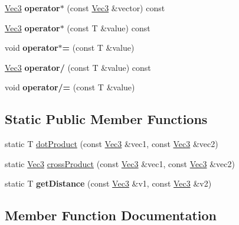 \begin{DoxyCompactItemize}
\item 
\hypertarget{classVec3_a2b0bcbfa60b9246c4d4caf4a16800a45}{}\hyperlink{classVec3}{Vec3} {\bfseries operator$\ast$} (const \hyperlink{classVec3}{Vec3} \&vector) const \label{classVec3_a2b0bcbfa60b9246c4d4caf4a16800a45}

\item 
\hypertarget{classVec3_a6e2368bfdc48fc5f511a46f506244528}{}\hyperlink{classVec3}{Vec3} {\bfseries operator$\ast$} (const T \&value) const \label{classVec3_a6e2368bfdc48fc5f511a46f506244528}

\item 
\hypertarget{classVec3_a2c0d79315c313547c607f8b59a498b50}{}void {\bfseries operator$\ast$=} (const T \&value)\label{classVec3_a2c0d79315c313547c607f8b59a498b50}

\item 
\hypertarget{classVec3_aaae44d307a6d0c142360ba4f50447d60}{}\hyperlink{classVec3}{Vec3} {\bfseries operator/} (const T \&value) const \label{classVec3_aaae44d307a6d0c142360ba4f50447d60}

\item 
\hypertarget{classVec3_a5a71e64e02e97ee191354b153800f3ff}{}void {\bfseries operator/=} (const T \&value)\label{classVec3_a5a71e64e02e97ee191354b153800f3ff}

\end{DoxyCompactItemize}
\subsection*{Static Public Member Functions}
\begin{DoxyCompactItemize}
\item 
static T \hyperlink{classVec3_aa34bd4ba6b5aa3abdc6186cc0cc8480a}{dot\+Product} (const \hyperlink{classVec3}{Vec3} \&vec1, const \hyperlink{classVec3}{Vec3} \&vec2)
\item 
static \hyperlink{classVec3}{Vec3} \hyperlink{classVec3_a24fbc9452cd9f123df8e08233b920068}{cross\+Product} (const \hyperlink{classVec3}{Vec3} \&vec1, const \hyperlink{classVec3}{Vec3} \&vec2)
\item 
\hypertarget{classVec3_a2fbe12b8c1120e803c32ab2fc826afa3}{}static T {\bfseries get\+Distance} (const \hyperlink{classVec3}{Vec3} \&v1, const \hyperlink{classVec3}{Vec3} \&v2)\label{classVec3_a2fbe12b8c1120e803c32ab2fc826afa3}

\end{DoxyCompactItemize}


\subsection{Member Function Documentation}
\hypertarget{classVec3_a24fbc9452cd9f123df8e08233b920068}{}
